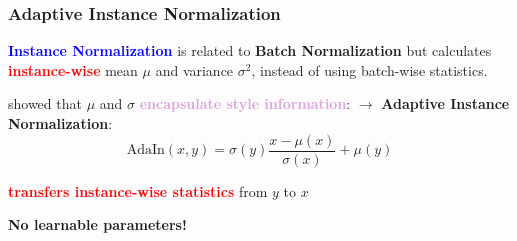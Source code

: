 \documentclass[11pt,xcolor=dvipsnames]{beamer}
\begin{document}
\begin{frame}
\frametitle{Adaptive Instance Normalization}

\textbf{\textcolor{blue}{Instance Normalization}} is related to \textbf{Batch Normalization} but calculates \textbf{\textcolor{red}{instance-wise}} mean $\mu$ and variance $\sigma^2$, instead of using batch-wise statistics.

\vspace{10pt}

\cite{adain} showed that $\mu$ and $\sigma$ \textbf{\textcolor{Plum}{encapsulate style information}}:
\vspace{10pt}
$\rightarrow$ \textbf{Adaptive Instance Normalization}:
\begin{equation*}
	\text{AdaIn}(x, y) = \sigma(y) \frac{x - \mu(x)}{\sigma(x)} + \mu(y)
\end{equation*}
\vspace{10pt}

\textbf{\textcolor{red}{transfers instance-wise statistics}} from $y$ to $x$

\vspace{10pt}

\textbf{No learnable parameters!}

\end{frame}
\end{document}
